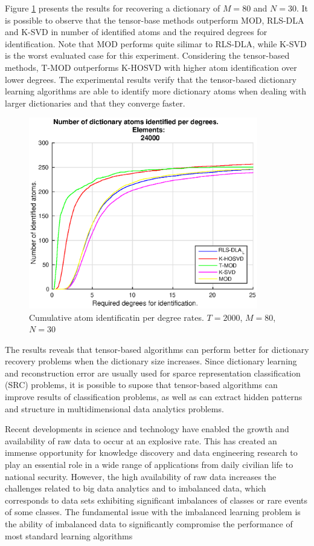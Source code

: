 Figure \ref{fig:fig2} presents the results for recovering a dictionary of $M=80$ and $N=30$. It is possible to observe that the tensor-base methods outperform MOD, RLS-DLA and K-SVD in number of identified atoms and the required degrees for identification. Note that MOD performs quite silimar to RLS-DLA, while K-SVD is the worst evaluated case for this experiment. Considering the tensor-based methods, T-MOD outperforms K-HOSVD with higher atom identification over lower degrees. The experimental results verify that the tensor-based dictionary learning algorithms are able to identify more dictionary atoms when dealing with larger dictionaries and that they converge faster.

\begin{figure}[!htb]
     \centering 
	 \includegraphics[width=10cm]{figures/5_20_2000_24000_100.eps}
     \caption{Cumulative atom identificatin per degree rates. $T=2000$, $M=80$, $N=30$}
     \label{fig:fig2}
\end{figure}

The results reveals that tensor-based algorithms can perform better for dictionary recovery problems when the dictionary size increases. Since dictionary learning and reconstruction error are usually used for sparce representation classification (SRC) problems, it is possible to supose that tensor-based algorithms can improve results of classification problems, as well as can extract hidden patterns and structure in multidimensional data analytics problems.

Recent developments in science and technology have enabled the growth and availability of raw data to occur at an explosive rate. This has created an immense opportunity for knowledge discovery and data engineering research to play an essential role in a wide range of applications from daily civilian life to national security. However, the high availability of raw data increases the challenges related to big data analytics and to imbalanced data, which corresponds to data sets exhibiting significant imbalances of classes or rare events of some classes. The fundamental issue with the imbalanced learning problem is the ability of imbalanced data to significantly compromise the performance of most standard learning algorithms

